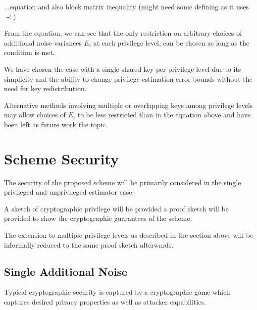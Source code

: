 \documentclass[conference]{IEEEtran}
\theoremstyle{definition}
\theoremstyle{definition}
\theoremstyle{remark}
\begin{document}
...equation and also block matrix inequality (might need some defining as it uses $\prec$)

From the equation, we can see that the only restriction on arbitrary choices of additional noise variances $E_i$ at each privilege level, can be chosen as long as the condition is met.

We have chosen the case with a single shared key per privilege level due to its simplicity and the ability to change privilege estimation error bounds without the need for key redistribution.

Alternative methods involving multiple or overlapping keys among privilege levels may allow choices of $E_i$ to be less restricted than in the equation above and have been left as future work the topic.

% 
%                                                                                        
%                                                                                        
%                                                                                        
% 

\section{Scheme Security}
The security of the proposed scheme will be primarily considered in the single privileged and unprivileged estimator case.

A sketch of cryptographic privilege will be provided
a proof sketch will be provided to show the cryptographic guarantees of the scheme.

The extension to multiple privilege levels as described in the section above will be informally reduced to the same proof sketch afterwards.

\subsection{Single Additional Noise}
Typical cryptographic security is captured by a cryptographic game which captures desired privacy properties as well as attacker capabilities. 
\end{document}
